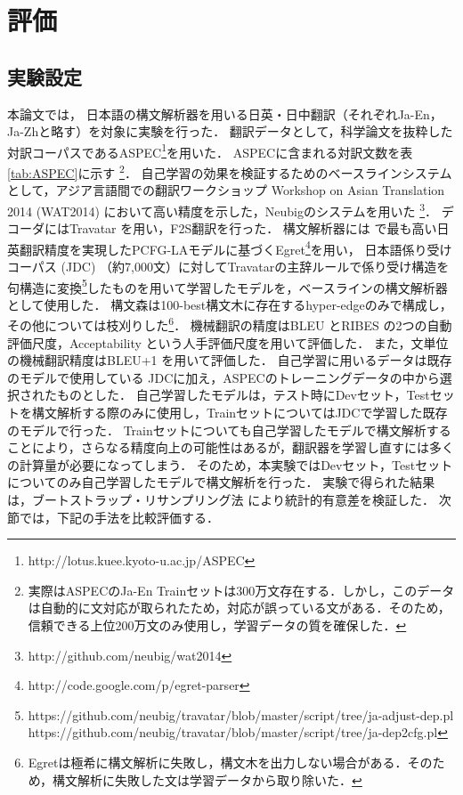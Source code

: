 \documentclass[japanese]{jnlp_1.4}
\begin{document}
\section{評価}

\subsection{実験設定}
\label{sec:experimental_setup}

本論文では，
\pagebreak
日本語の構文解析器を用いる日英・日中翻訳（それぞれJa-En，Ja-Zhと略す）を対象に実験を行った．
翻訳データとして，科学論文を抜粋した対訳コーパスであるASPEC\footnote{http://lotus.kuee.kyoto-u.ac.jp/ASPEC}を用いた．
ASPECに含まれる対訳文数を表\ref{tab:ASPEC}に示す
\footnote{実際はASPECのJa-En Trainセットは300万文存在する．しかし，このデータは自動的に文対応が取られたため，対応が誤っている文がある．そのため，信頼できる上位200万文のみ使用し，学習データの質を確保した．}．
自己学習の効果を検証するためのベースラインシステムとして，アジア言語間での翻訳ワークショップ Workshop on Asian Translation 2014 (WAT2014) \cite{nakazawa14wat} において高い精度を示した，Neubigのシステムを用いた \cite{neubig14wat}\footnote{http://github.com/neubig/wat2014}．
デコーダにはTravatar \cite{neubig13travatar} を用い，F2S翻訳を行った．
構文解析器には \cite{neubig14acl} で最も高い日英翻訳精度を実現したPCFG-LAモデルに基づくEgret\footnote{http://code.google.com/p/egret-parser}を用い，
日本語係り受けコーパス (JDC) \cite{mori14jtb} （約7,000文）に対してTravatarの主辞ルールで係り受け構造を句構造に変換\footnote{https://github.com/neubig/travatar/blob/master/script/tree/ja-adjust-dep.pl\\https://github.com/neubig/travatar/blob/master/script/tree/ja-dep2cfg.pl}したものを用いて学習したモデルを，ベースラインの構文解析器として使用した．
構文森は100-best構文木に存在するhyper-edgeのみで構成し，その他については枝刈りした\footnote{Egretは極希に構文解析に失敗し，構文木を出力しない場合がある．そのため，構文解析に失敗した文は学習データから取り除いた．}．
機械翻訳の精度はBLEU \cite{papineni02bleu}とRIBES \cite{isozaki10ribes} の2つの自動評価尺度，Acceptability \cite{goto11ntcir} という人手評価尺度を用いて評価した．
また，文単位の機械翻訳精度はBLEU+1 \cite{lin04orange} を用いて評価した．
自己学習に用いるデータは既存のモデルで使用している
JDCに加え，ASPECのトレーニングデータの中から選択されたものとした．
自己学習したモデルは，テスト時にDevセット，Testセットを構文解析する際のみに使用し，TrainセットについてはJDCで学習した既存のモデルで行った．
Trainセットについても自己学習したモデルで構文解析することにより，さらなる精度向上の可能性はあるが，翻訳器を学習し直すには多くの計算量が必要になってしまう．
そのため，本実験ではDevセット，Testセットについてのみ自己学習したモデルで構文解析を行った．
実験で得られた結果は，ブートストラップ・リサンプリング法 \cite{koehn04sigtest} により統計的有意差を検証した．
次節では，下記の手法を比較評価する．
\end{document}
